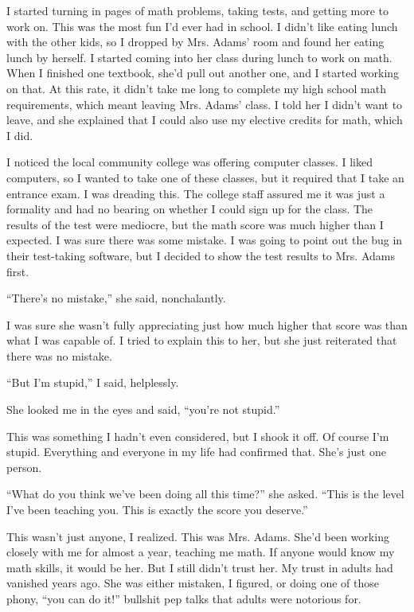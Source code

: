I started turning in pages of math problems, taking tests, and getting more to work on. This was the most fun I'd ever had in school. I didn't like eating lunch with the other kids, so I dropped by Mrs. Adams' room and found her eating lunch by herself. I started coming into her class during lunch to work on math. When I finished one textbook, she'd pull out another one, and I started working on that. At this rate, it didn't take me long to complete my high school math requirements, which meant leaving Mrs. Adams' class. I told her I didn't want to leave, and she explained that I could also use my elective credits for math, which I did. 

I noticed the local community college was offering computer classes. I liked computers, so I wanted to take one of these classes, but it required that I take an entrance exam. I was dreading this. The college staff assured me it was just a formality and had no bearing on whether I could sign up for the class. The results of the test were mediocre, but the math score was much higher than I expected. I was sure there was some mistake. I was going to point out the bug in their test-taking software, but I decided to show the test results to Mrs. Adams first.

``There's no mistake,'' she said, nonchalantly.

I was sure she wasn't fully appreciating just how much higher that score was than what I was capable of. I tried to explain this to her, but she just reiterated that there was no mistake.

``But I'm stupid,'' I said, helplessly.

She looked me in the eyes and said, ``you're not stupid.''

This was something I hadn't even considered, but I shook it off. Of course I'm stupid. Everything and everyone in my life had confirmed that. She's just one person.

``What do you think we've been doing all this time?'' she asked. ``This is the level I've been teaching you. This is exactly the score you deserve.''

This wasn't just anyone, I realized. This was Mrs. Adams. She'd been working closely with me for almost a year, teaching me math. If anyone would know my math skills, it would be her. But I still didn't trust her. My trust in adults had vanished years ago. She was either mistaken, I figured, or doing one of those phony, ``you can do it!'' bullshit pep talks that adults were notorious for.

